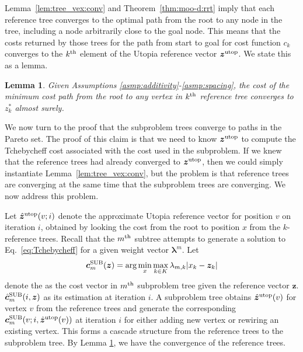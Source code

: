 \documentclass{article}
\newtheorem{lem}{Lemma}
\begin{document}
Lemma~\ref{lem:tree_vex:conv} and Theorem~\ref{thm:moo-d:rrt} imply that each reference tree converges to the optimal path from the root to any node in the tree, including a node arbitrarily close to the goal node.  
This means that the costs returned by those trees for the path from start to goal for cost function $c_k$ converges to the $k^{\rm th}$ element of the Utopia reference vector $ \bm{z}^{\rm utop} $.  
We state this as a lemma.
\begin{lem}
\label{lem:ref_tree:conv}
Given Assumptions \ref{asmp:additivity}-\ref{asmp:spacing},
the cost of the minimum cost path from the root to any vertex in $ k^{\rm th} $ reference tree converges to $ z^{*}_{k} $ almost surely. %
\end{lem}

We now turn to the proof that the subproblem trees converge to paths in the Pareto set.
The proof of this claim is that we need to know $\bm{z}^{\rm utop} $ to compute the Tchebycheff cost associated with the cost used in the subproblem. 
If we knew that the reference trees had already converged to $\bm{z}^{\rm utop} $, then we could simply instantiate Lemma~\ref{lem:tree_vex:conv}, but the problem is that reference trees are converging at the same time that the subproblem trees are converging.
We now address this problem.  

Let $ \hat{\bm{z}}^{\rm utop}(v;i) $ denote the approximate Utopia reference vector for position $v$ on iteration $i$, obtained by looking the cost from the root to position $x$ from the $k$-reference trees.
Recall that the $m^{\rm th}$ subtree attempts to generate a solution to Eq.~\eqref{eq:Tchebycheff} for a given weight vector ${\mathbf \lambda}^m$.
Let
\begin{equation}
\label{eq:c_def}
 \bm{c}^{\rm SUB}_{m} ( \bm{z} ) 
 = \arg \min_{x} \max_{ k \in K } \lambda_{m, k} | x_{k} - \bm{z}_{k} | 
\end{equation} denote the as the cost vector in $ m^{\rm th} $ subproblem tree given the reference vector $ \bm{z} $.
$ \hat{ \bm{c} }^{\rm SUB}_{m} ( i, \bm{z} ) $ as its estimation at iteration $ i $.
A subproblem tree obtains $ \hat{\bm{z}}^{\rm utop} (v) $ for vertex $ v $ from the reference trees and generate the corresponding $ \bm{c}^{\rm SUB}_{m} ( v ; i, \hat{\bm{z}}^{\rm utop} (v) ) $ at iteration $ i $ for either adding new vertex or rewiring an existing vertex.
This forms a cascade structure from the reference trees to the subproblem tree. 
By Lemma \ref{lem:ref_tree:conv}, we have the convergence of the reference trees.
\end{document}
